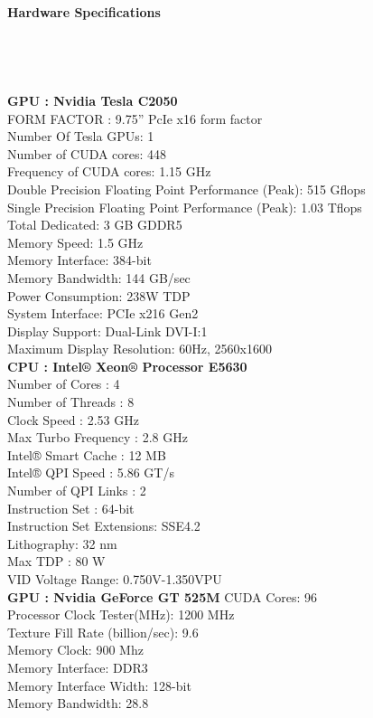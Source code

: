 \newpage
{\bf \LARGE Hardware Specifications}\\\\\\\\\\

\textbf{GPU : Nvidia Tesla C2050}\\
FORM FACTOR : 9.75” PcIe x16 form factor\\
Number Of Tesla GPUs: 1\\
Number of CUDA cores: 448\\
Frequency of CUDA cores: 1.15 GHz\\
Double Precision Floating Point Performance (Peak):  515 Gflops\\
Single Precision Floating Point Performance (Peak):  1.03 Tflops\\  
Total Dedicated: 3 GB GDDR5\\
Memory Speed: 1.5 GHz\\
Memory Interface:  384-bit\\
Memory Bandwidth:  144 GB/sec\\
Power Consumption:  238W TDP\\
System Interface:  PCIe x216 Gen2\\
Display Support:  Dual-Link DVI-I:1\\
Maximum Display Resolution: 60Hz, 2560x1600\\

\textbf{CPU : Intel® Xeon® Processor E5630}\\ 
Number  of Cores    : 4\\
Number of Threads   : 8\\
Clock Speed         : 2.53 GHz\\
Max Turbo Frequency : 	2.8 GHz\\
Intel® Smart Cache  : 	12 MB\\
Intel® QPI Speed    :	5.86 GT/s\\
Number of QPI Links : 	2\\
Instruction Set     : 	64-bit\\
Instruction Set Extensions: SSE4.2\\
Lithography: 32 nm\\
Max TDP : 80 W\\
VID Voltage Range: 0.750V-1.350VPU\\

\textbf{GPU : Nvidia GeForce GT 525M}
CUDA Cores: 96\\
Processor Clock Tester(MHz):  1200 MHz\\
Texture Fill Rate (billion/sec):  9.6\\
Memory Clock:  900 Mhz\\
Memory Interface:  DDR3\\
Memory Interface Width: 128-bit\\
Memory Bandwidth: 28.8\\

